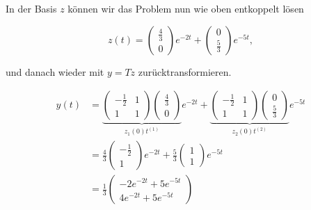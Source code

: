 In der Basis \( z \) können wir das Problem nun wie oben entkoppelt lösen 

\begin{equation*}
    z(t) = 
    \begin{pmatrix}
        \frac{4}{3} \\
        0
    \end{pmatrix} e^{-2t} +
    \begin{pmatrix}
        0 \\
        \frac{5}{3}
    \end{pmatrix} e^{-5t} ,
\end{equation*}

und danach wieder mit \( y = Tz \) zurücktransformieren.

\begin{equation*}
    \begin{aligned}
        y(t) &= 
        \underbrace{\begin{pmatrix}
            -\frac{1}{2} & 1 \\
            1 & 1
        \end{pmatrix}
        \begin{pmatrix}
            \frac{4}{3} \\
            0
        \end{pmatrix}}_{z_1(0) t^{(1)}} e^{-2t} + 
        \underbrace{\begin{pmatrix}
            -\frac{1}{2} & 1 \\
            1 & 1
        \end{pmatrix}
        \begin{pmatrix}
            0 \\
            \frac{5}{3}
        \end{pmatrix}}_{z_2(0) t^{(2)}} e^{-5t} \\[0.5em]
        &= \frac{4}{3} \begin{pmatrix}
            -\frac{1}{2} \\ 1
        \end{pmatrix} e^{-2t} + \frac{5}{3} \begin{pmatrix}
            1 \\ 1
        \end{pmatrix} e^{-5t} \\[0.5em]
        &= \frac{1}{3} \begin{pmatrix}
            -2 e^{-2t} + 5 e^{-5t} \\
            4 e^{-2t} + 5 e^{-5t}
        \end{pmatrix} 
    \end{aligned}
\end{equation*}


